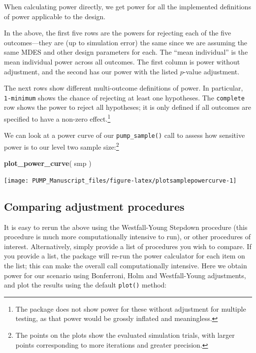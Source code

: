 \documentclass[
]{article}
\newenvironment{Shaded}{\begin{snugshade}}{\end{snugshade}}
\newcommand{\KeywordTok}[1]{\textcolor[rgb]{0.13,0.29,0.53}{\textbf{#1}}}
\newcommand{\NormalTok}[1]{#1}
\begin{document}
When calculating power directly, we get power for all the implemented
definitions of power applicable to the design.

In the above, the first five rows are the powers for rejecting each of
the five outcomes---they are (up to simulation error) the same since we
are assuming the same MDES and other design parameters for each. The
``mean individual'' is the mean individual power across all outcomes.
The first column is power without adjustment, and the second has our
power with the listed \(p\)-value adjustment.

The next rows show different multi-outcome definitions of power. In
particular, \texttt{1-minimum} shows the chance of rejecting at least
one hypotheses. The \texttt{complete} row shows the power to reject all
hypotheses; it is only defined if all outcomes are specified to have a
non-zero
effect.\footnote{The package does not show power for these without adjustment for multiple testing, as that power would be grossly inflated and meaningless.}

We can look at a power curve of our \texttt{pump\_sample()} call to
assess how sensitive power is to our level two sample
size:\footnote{The points on the plots show the evaluated simulation trials, with larger points corresponding to more iterations and greater precision.}

\begin{Shaded}
\begin{Highlighting}[]
\KeywordTok{plot\_power\_curve}\NormalTok{( smp )}
\end{Highlighting}
\end{Shaded}

\begin{center}\texttt{[image: PUMP\_Manuscript\_files/figure-latex/plotsamplepowercurve-1]} \end{center}

\subsection{Comparing adjustment procedures}

It is easy to rerun the above using the Westfall-Young Stepdown
procedure (this procedure is much more computationally intensive to
run), or other procedures of interest. Alternatively, simply provide a
list of procedures you wish to compare. If you provide a list, the
package will re-run the power calculator for each item on the list; this
can make the overall call computationally intensive. Here we obtain
power for our scenario using Bonferroni, Holm and Westfall-Young
adjustments, and plot the results using the default \texttt{plot()}
method:
\end{document}
